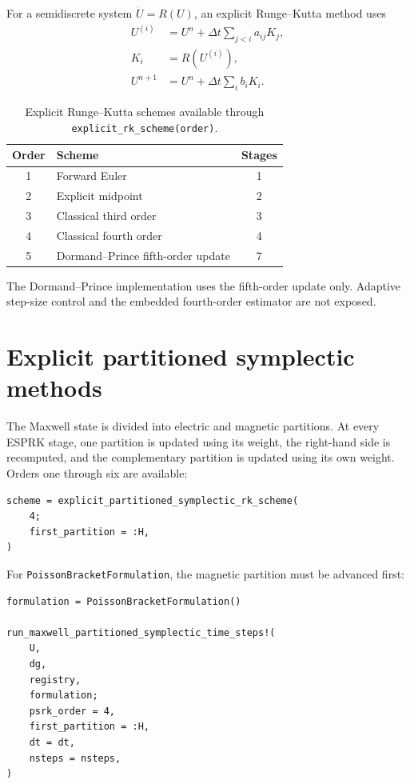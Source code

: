 \documentclass[11pt,oneside]{book}
\newcommand{\code}[1]{\texttt{#1}}
\begin{document}
For a semidiscrete system $\dot U=R(U)$, an explicit Runge--Kutta method uses
\begin{align}
  U^{(i)} &= U^n + \Delta t\sum_{j<i}a_{ij}K_j,\\
  K_i &= R(U^{(i)}),\\
  U^{n+1} &= U^n + \Delta t\sum_i b_iK_i.
\end{align}

\begin{table}[htbp]
\centering
\caption{Explicit Runge--Kutta schemes available through
\code{explicit\_rk\_scheme(order)}.}
\begin{tabular}{clc}
\toprule
Order & Scheme & Stages \\
\midrule
1 & Forward Euler & 1 \\
2 & Explicit midpoint & 2 \\
3 & Classical third order & 3 \\
4 & Classical fourth order & 4 \\
5 & Dormand--Prince fifth-order update & 7 \\
\bottomrule
\end{tabular}
\end{table}

The Dormand--Prince implementation uses the fifth-order update only. Adaptive
step-size control and the embedded fourth-order estimator are not exposed.

\section{Explicit partitioned symplectic methods}

The Maxwell state is divided into electric and magnetic partitions. At every
ESPRK stage, one partition is updated using its weight, the right-hand side is
recomputed, and the complementary partition is updated using its own weight.
Orders one through six are available:

\begin{lstlisting}
scheme = explicit_partitioned_symplectic_rk_scheme(
    4;
    first_partition = :H,
)
\end{lstlisting}

For \code{PoissonBracketFormulation}, the magnetic partition must be advanced
first:

\begin{lstlisting}
formulation = PoissonBracketFormulation()

run_maxwell_partitioned_symplectic_time_steps!(
    U,
    dg,
    registry,
    formulation;
    psrk_order = 4,
    first_partition = :H,
    dt = dt,
    nsteps = nsteps,
)
\end{lstlisting}
\end{document}
